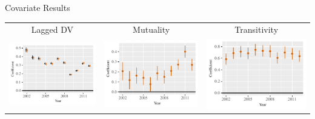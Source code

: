 \documentclass{beamer}
\begin{document}
\begin{frame}{Covariate Results}
\begin{tabular}{c@{\hskip -.4cm}c@{\hskip -.4cm}c}
Lagged DV& Mutuality & Transitivity \\ 
\includegraphics[height=.3\textheight, clip=true, trim=.5cm .5cm 0cm .1cm]{slides_figures/rl_plots/LDV.pdf} 
 &
\includegraphics[height=.3\textheight, clip=true, trim=.5cm .5cm 0cm .1cm]{slides_figures/rl_plots/Mutuality.pdf}   &
\includegraphics[height=.3\textheight, clip=true, trim=.5cm .5cm 0cm .1cm]{slides_figures/rl_plots/Transitivity.pdf} \\  
\end{tabular}



\end{frame}
\end{document}
